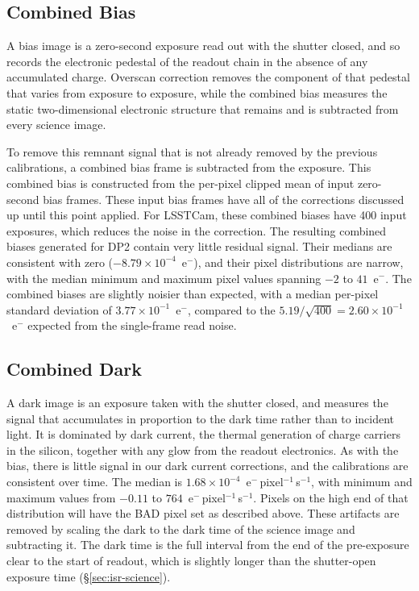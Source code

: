 

\subsection{Combined Bias} \label{sec:calibration-production:bias}

A bias image is a zero-second exposure read out with the shutter closed, and so records the electronic pedestal of the readout chain in the absence of any accumulated charge.
Overscan correction removes the component of that pedestal that varies from exposure to exposure, while the combined bias measures the static two-dimensional electronic structure that remains and is subtracted from every science image.

To remove this remnant signal that is not already removed by the previous calibrations, a combined bias frame is subtracted from the exposure.
This combined bias is constructed from the per-pixel clipped mean of input zero-second bias frames.
These input bias frames have all of the corrections discussed up until this point applied.
For LSSTCam, these combined biases have 400 input exposures, which reduces the noise in the correction.
The resulting combined biases generated for DP2 contain very little residual signal.
Their medians are consistent with zero ($-8.79 \times 10^{-4}$~e$^-$), and their pixel distributions are narrow, with the median minimum and maximum pixel values spanning $-2$ to $41$~e$^-$.
The combined biases are slightly noisier than expected, with a median per-pixel standard deviation of $3.77 \times 10^{-1}$~e$^-$, compared to the $5.19/\sqrt{400} = 2.60 \times 10^{-1}$~e$^-$ expected from the single-frame read noise.

\subsection{Combined Dark} \label{sec:calibration-production:dark}

A dark image is an exposure taken with the shutter closed, and measures the signal that accumulates in proportion to the dark time rather than to incident light. It is dominated by dark current, the thermal generation of charge carriers in the silicon, together with any glow from the readout electronics.
As with the bias, there is little signal in our dark current corrections, and the calibrations are consistent over time.
The median is $1.68 \times 10^{-4}$~e$^-$\,pixel$^{-1}$\,s$^{-1}$, with minimum and maximum values from $-0.11$ to $764$~e$^-$\,pixel$^{-1}$\,s$^{-1}$.
Pixels on the high end of that distribution will have the BAD pixel set as described above.
These artifacts are removed by scaling the dark to the dark time of the science image and subtracting it.
The dark time is the full interval from the end of the pre-exposure clear to the start of readout, which is slightly longer than the shutter-open exposure time (\S\ref{sec:isr-science}).

